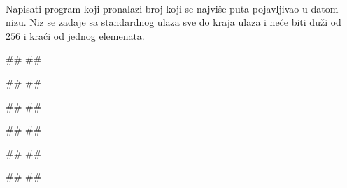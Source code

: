 \begin{Answer}[ref=3_14]
  \\
\end{Answer}
\begin{Exercise}[label=3_15]
  Napisati program koji pronalazi broj koji se najviše puta
  pojavljivao u datom nizu. Niz se zadaje sa standardnog ulaza sve do
  kraja ulaza i neće biti duži od $256$ i kraći od jednog
  elemenata.   

\begin{minitest}
\begin{test}{1}
#\naslovUlaz#
##
  
#\naslovIzlaz#
##
\end{test}
\end{minitest}
\begin{minitest}
\begin{test}{2}
#\naslovUlaz#
##
  
#\naslovIzlaz#
##
\end{test}
\end{minitest}
\begin{minitest}
\begin{test}{3}
#\naslovUlaz#
##
  
#\naslovIzlaz#
##
\end{test}
\end{minitest}

\end{Exercise}

